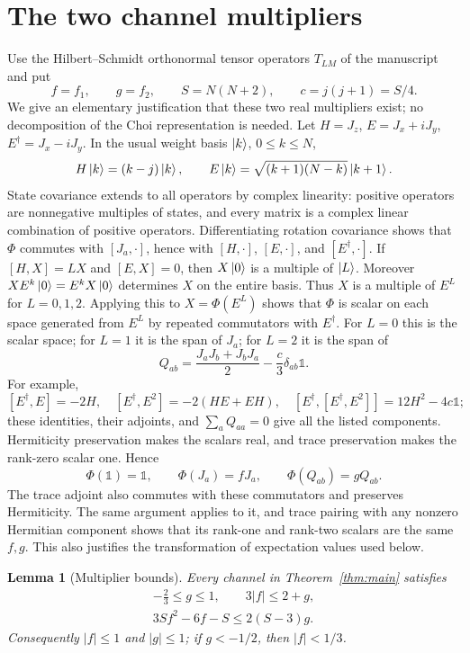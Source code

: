 \documentclass[11pt,a4paper]{article}
\newcommand{\id}{\mathds{1}}
\newtheorem{lemma}{Lemma}
\begin{document}
\section{The two channel multipliers}
Use the Hilbert--Schmidt orthonormal tensor operators $T_{LM}$ of the
manuscript and put
\[
 f=f_1,\qquad g=f_2,\qquad S=N(N+2),\qquad c=j(j+1)=S/4.
\]
We give an elementary justification that these two real multipliers exist;
no decomposition of the Choi representation is needed.
Let $H=J_z$, $E=J_x+iJ_y$, $E^\dagger=J_x-iJ_y$. In the usual
weight basis $\ket{k}$, $0\le k\le N$,
\[
 H\ket{k}=(k-j)\ket{k},\qquad
 E\ket{k}=\sqrt{(k+1)(N-k)}\ket{k+1}.
\]
State covariance extends to all operators by complex linearity: positive
operators are nonnegative multiples of states, and every matrix is a
complex linear combination of positive operators. Differentiating
rotation covariance shows that $\Phi$ commutes with
$[J_a,\cdot]$, hence with $[H,\cdot]$, $[E,\cdot]$, and
$[E^\dagger,\cdot]$.
If $[H,X]=LX$ and $[E,X]=0$, then $X\ket{0}$ is a multiple of
$\ket{L}$. Moreover $X E^k\ket{0}=E^kX\ket{0}$ determines $X$
on the entire basis. Thus $X$ is a multiple of $E^L$ for
$L=0,1,2$. Applying this to $X=\Phi(E^L)$ shows that $\Phi$
is scalar on each space generated from $E^L$ by repeated commutators
with $E^\dagger$. For $L=0$ this is the scalar space; for $L=1$
it is the span of $J_a$; for $L=2$ it is the span of
\[
 Q_{ab}=\frac{J_aJ_b+J_bJ_a}{2}-\frac c3\delta_{ab}\id.
\]
For example,
\[
 [E^\dagger,E]=-2H,\quad
 [E^\dagger,E^2]=-2(HE+EH),\quad
 [E^\dagger,[E^\dagger,E^2]]=12H^2-4c\id;
\]
these identities, their adjoints, and $\sum_aQ_{aa}=0$ give all the
listed components.
Hermiticity preservation makes the scalars real, and trace preservation
makes the rank-zero scalar one. Hence
\[
 \Phi(\id)=\id,\qquad \Phi(J_a)=fJ_a,\qquad \Phi(Q_{ab})=gQ_{ab}.
\]
The trace adjoint also commutes with these commutators and preserves
Hermiticity. The same argument applies to it, and trace pairing with
any nonzero Hermitian component shows that its rank-one and rank-two
scalars are the same $f,g$. This also justifies the transformation of
expectation values used below.

\begin{lemma}[Multiplier bounds]\label{lem:multipliers}
Every channel in Theorem~\ref{thm:main} satisfies
\begin{align}
 -\frac23\le g\le1,\qquad 3|f|\le2+g,\label{eq:region}\\
 3Sf^2-6f-S\le2(S-3)g.\label{eq:curved}
\end{align}
Consequently $|f|\le1$ and $|g|\le1$; if $g<-1/2$, then $|f|<1/3$.
\end{lemma}
\end{document}
